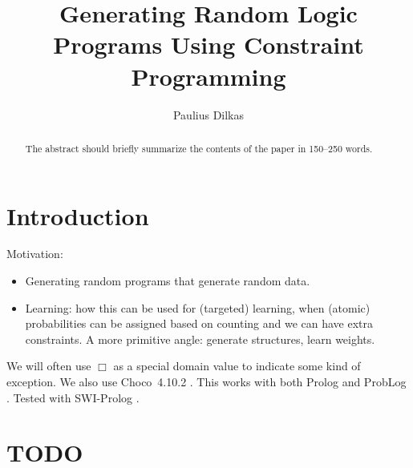 \documentclass[runningheads]{llncs}
\begin{document}
\title{Generating Random Logic Programs Using Constraint Programming}
\author{Paulius Dilkas}

\maketitle

\begin{abstract}
The abstract should briefly summarize the contents of the paper in
150--250 words.

\end{abstract}

\section{Introduction}

Motivation:
\begin{itemize}
\item Generating random programs that generate random data.
\item Learning: how this can be used for (targeted) learning, when (atomic)
  probabilities can be assigned based on counting and we can have extra
  constraints. A more primitive angle: generate structures, learn weights.
\end{itemize}

We will often use $\Box$ as a special domain value to indicate some kind of
exception. We also use Choco~4.10.2 \cite{choco}. This works with both Prolog
\cite{DBLP:books/daglib/0041598} and ProbLog \cite{DBLP:conf/ijcai/RaedtKT07}.
Tested with SWI-Prolog \cite{DBLP:journals/tplp/WielemakerSTL12}.

\section{TODO}
\end{document}
